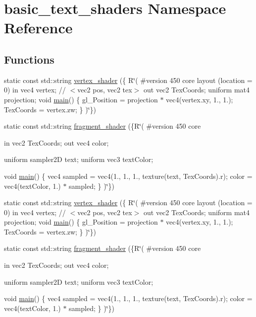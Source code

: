 \hypertarget{namespacebasic__text__shaders}{}\section{basic\+\_\+text\+\_\+shaders Namespace Reference}
\label{namespacebasic__text__shaders}
\subsection*{Functions}
\begin{DoxyCompactItemize}
\item 
static const std\+::string \mbox{\hyperlink{namespacebasic__text__shaders_a3a1e289b8d23fe7bbc727f210d18a3d2}{vertex\+\_\+shader}} (\{ R\char`\"{}(
\#version 450 core
layout (location = 0) in vec4 vertex; // $<$vec2 pos, vec2 tex$>$
out vec2 Tex\+Coords;
uniform mat4 projection;
void \mbox{\hyperlink{gtest__tests_8cpp_a3c04138a5bfe5d72780bb7e82a18e627}{main}}()
\{
gl\+\_\+\+Position = projection $\ast$ vec4(vertex.\+xy, 1., 1.);
Tex\+Coords = vertex.\+zw;
\}
)\char`\"{}\})
\item 
static const std\+::string \mbox{\hyperlink{namespacebasic__text__shaders_a1b36935432456ef648cb7c3704d25a6d}{fragment\+\_\+shader}} (\{R\char`\"{}(
\#version 450 core

in vec2 Tex\+Coords;
out vec4 color;

uniform sampler2D text;
uniform vec3 text\+Color;

void \mbox{\hyperlink{gtest__tests_8cpp_a3c04138a5bfe5d72780bb7e82a18e627}{main}}()
\{
vec4 sampled = vec4(1., 1., 1., texture(text, Tex\+Coords).r);
color = vec4(text\+Color, 1.) $\ast$ sampled;
\}
)\char`\"{}\})
\item 
static const std\+::string \mbox{\hyperlink{namespacebasic__text__shaders_a3a1e289b8d23fe7bbc727f210d18a3d2}{vertex\+\_\+shader}} (\{ R\char`\"{}(
\#version 450 core
layout (location = 0) in vec4 vertex; // $<$vec2 pos, vec2 tex$>$
out vec2 Tex\+Coords;
uniform mat4 projection;
void \mbox{\hyperlink{gtest__tests_8cpp_a3c04138a5bfe5d72780bb7e82a18e627}{main}}()
\{
gl\+\_\+\+Position = projection $\ast$ vec4(vertex.\+xy, 1., 1.);
Tex\+Coords = vertex.\+zw;
\}
)\char`\"{}\})
\item 
static const std\+::string \mbox{\hyperlink{namespacebasic__text__shaders_a1b36935432456ef648cb7c3704d25a6d}{fragment\+\_\+shader}} (\{R\char`\"{}(
\#version 450 core

in vec2 Tex\+Coords;
out vec4 color;

uniform sampler2D text;
uniform vec3 text\+Color;

void \mbox{\hyperlink{gtest__tests_8cpp_a3c04138a5bfe5d72780bb7e82a18e627}{main}}()
\{
vec4 sampled = vec4(1., 1., 1., texture(text, Tex\+Coords).r);
color = vec4(text\+Color, 1.) $\ast$ sampled;
\}
)\char`\"{}\})
\end{DoxyCompactItemize}


